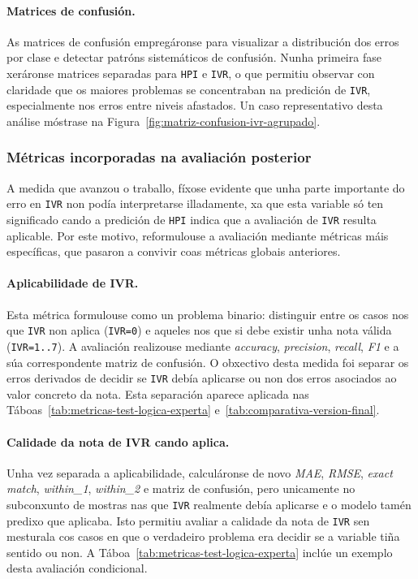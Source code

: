 \paragraph{Matrices de confusión.}
As matrices de confusión empregáronse para visualizar a distribución dos erros por clase e detectar
patróns sistemáticos de confusión. Nunha primeira fase xeráronse matrices separadas para
\texttt{HPI} e \texttt{IVR}, o que permitiu observar con claridade que os maiores problemas se
concentraban na predición de \texttt{IVR}, especialmente nos erros entre niveis afastados. Un caso
representativo desta análise móstrase na Figura~\ref{fig:matriz-confusion-ivr-agrupado}.

\subsubsection{Métricas incorporadas na avaliación posterior}
\label{sec:metricas-avaliacion-posterior}
A medida que avanzou o traballo, fíxose evidente que unha parte importante do erro en \texttt{IVR}
non podía interpretarse illadamente, xa que esta variable só ten significado cando a predición de
\texttt{HPI} indica que a avaliación de \texttt{IVR} resulta aplicable. Por este motivo,
reformulouse a avaliación mediante métricas máis específicas, que pasaron a convivir coas métricas
globais anteriores.

\paragraph{Aplicabilidade de IVR.}
Esta métrica formulouse como un problema binario: distinguir entre os casos nos que \texttt{IVR} non
aplica (\texttt{IVR=0}) e aqueles nos que si debe existir unha nota válida (\texttt{IVR=1..7}). A
avaliación realizouse mediante \textit{accuracy}, \textit{precision}, \textit{recall}, \textit{F1}
e a súa correspondente matriz de confusión. O obxectivo desta medida foi separar os erros derivados
de decidir se \texttt{IVR} debía aplicarse ou non dos erros asociados ao valor concreto da nota. Esta
separación aparece aplicada nas Táboas~\ref{tab:metricas-test-logica-experta}
e~\ref{tab:comparativa-version-final}.

\paragraph{Calidade da nota de IVR cando aplica.}
Unha vez separada a aplicabilidade, calculáronse de novo \textit{MAE}, \textit{RMSE},
\textit{exact match}, \textit{within\_1}, \textit{within\_2} e matriz de confusión, pero unicamente
no subconxunto de mostras nas que \texttt{IVR} realmente debía aplicarse e o modelo tamén predixo
que aplicaba. Isto permitiu avaliar a calidade da nota de \texttt{IVR} sen mesturala cos casos en
que o verdadeiro problema era decidir se a variable tiña sentido ou non. A Táboa~\ref{tab:metricas-test-logica-experta}
inclúe un exemplo desta avaliación condicional.

